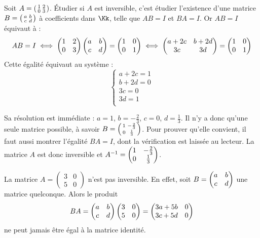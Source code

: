 \documentclass[class=report,crop=false]{standalone}
\begin{document}
\begin{exemple}
Soit $A=\left(\begin{smallmatrix}
1 & 2 \cr
0 & 3 \cr
\end{smallmatrix}\right)$.
\'Etudier si $A$ est inversible, c'est étudier l'existence d'une matrice
$B= \left(\begin{smallmatrix}
a & b \cr
c & d\cr
\end{smallmatrix}\right)$ à coefficients dans $\Kk$, telle que $AB=I$ et $BA=I$.
Or $AB=I$ équivaut à :
$$
AB=I \iff
\begin{pmatrix}
1 & 2 \cr
0 & 3\cr
\end{pmatrix}
\begin{pmatrix}
a & b \cr
c & d\cr
\end{pmatrix}
=\begin{pmatrix}
1 & 0 \cr
0 & 1\cr
\end{pmatrix}
\iff
\begin{pmatrix}
a+2c & b+2d \cr
3c & 3d\cr
\end{pmatrix}
=\begin{pmatrix}
1 & 0 \cr
0 & 1\cr
\end{pmatrix}
$$
Cette égalité équivaut au système  :
$$\left \{ \begin{array}{l}
a+2c=1\\
b+2d=0\\
3c=0\\
3d=1\\
\end{array} \right .$$

Sa résolution est immédiate : $a=1$, $b=-\frac23$, $c=0$, $d=\frac13$.
Il n'y a donc qu'une seule matrice possible, à savoir
$B=\left(\begin{smallmatrix}
1 & -\frac23 \cr
0 & \frac13\cr
\end{smallmatrix}\right)$.
Pour prouver qu'elle convient, il faut aussi montrer l'égalité $BA=I$,
dont la vérification est laissée au lecteur.
La matrice $A$ est donc inversible et $A^{-1}= \begin{pmatrix}
1 & -\frac23 \cr
0 & \frac13\cr
\end{pmatrix}$.
\end{exemple}

\begin{exemple}
La matrice
$ A = \left(\begin{smallmatrix}
3 & 0\\
5 & 0\end{smallmatrix}\right)$
n'est pas inversible. En effet, soit
$B= \begin{pmatrix}
a & b \cr
c & d\cr
\end{pmatrix}$ une matrice quelconque.
Alors le produit
$$
BA =
\begin{pmatrix}
a & b \cr
c & d\cr
\end{pmatrix}
\begin{pmatrix}
3 & 0\\
5 & 0
\end{pmatrix}
=
\begin{pmatrix}
3a+5b & 0\\
3c+5d      & 0
\end{pmatrix}$$
ne peut jamais être égal à la matrice identité.
\end{exemple}
\end{document}
